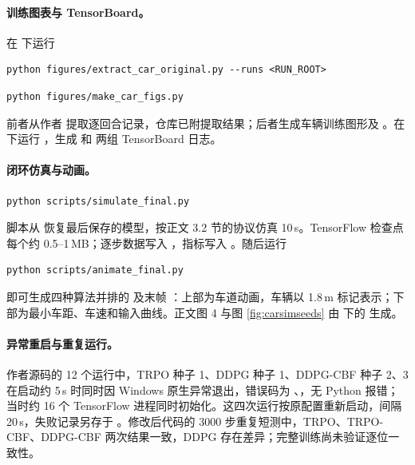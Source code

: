 \documentclass[UTF8,a4paper,zihao=-4,fontset=fandol]{ctexart}
\begin{document}
\paragraph{训练图表与 TensorBoard。}
在  下运行
\begin{lstlisting}[language={},numbers=none,frame=none,breakatwhitespace=true,aboveskip=5pt,belowskip=7pt]
python figures/extract_car_original.py --runs <RUN_ROOT>
\end{lstlisting}
\begin{lstlisting}[language={},numbers=none,frame=none,breakatwhitespace=true,aboveskip=5pt,belowskip=7pt]
python figures/make_car_figs.py
\end{lstlisting}
前者从作者  提取逐回合记录，仓库已附提取结果；后者生成车辆训练图形及 。在  下运行 ，生成  和  两组 TensorBoard 日志。

\paragraph{闭环仿真与动画。}
\begin{lstlisting}[language={},numbers=none,frame=none,breakatwhitespace=true,aboveskip=5pt,belowskip=7pt]
python scripts/simulate_final.py
\end{lstlisting}
脚本从  恢复最后保存的模型，按正文 3.2 节的协议仿真 10\,s。TensorFlow 检查点每个约 0.5–1\,MB；逐步数据写入 ，指标写入 。随后运行
\begin{lstlisting}[language={},numbers=none,frame=none,breakatwhitespace=true,aboveskip=5pt,belowskip=7pt]
python scripts/animate_final.py
\end{lstlisting}
即可生成四种算法并排的  及末帧 ：上部为车道动画，车辆以 1.8\,m 标记表示；下部为最小车距、车速和输入曲线。正文图 4 与图 \ref{fig:carsimseeds} 由  下的  生成。

\paragraph{异常重启与重复运行。}
作者源码的 12 个运行中，TRPO 种子 1、DDPG 种子 1、DDPG-CBF 种子 2、3 在启动约 5\,s 时同时因 Windows 原生异常退出，错误码为 、，无 Python 报错；当时约 16 个 TensorFlow 进程同时初始化。这四次运行按原配置重新启动，间隔 20\,s，失败记录另存于 。修改后代码的 3000 步重复短测中，TRPO、TRPO-CBF、DDPG-CBF 两次结果一致，DDPG 存在差异；完整训练尚未验证逐位一致性。
\end{document}
